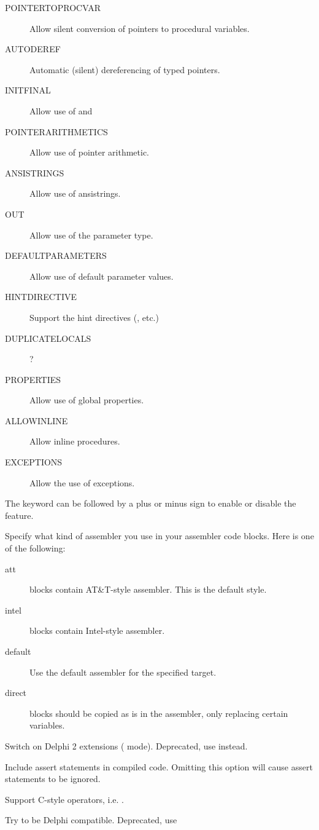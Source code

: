 \begin{description}
\begin{description}
\item[POINTERTOPROCVAR] Allow silent conversion of pointers to procedural
variables.
\item[AUTODEREF] Automatic (silent) dereferencing of typed pointers.
\item[INITFINAL] Allow use of  and 
\item[POINTERARITHMETICS] Allow use of pointer arithmetic.
\item[ANSISTRINGS] Allow use of ansistrings.
\item[OUT] Allow use of the  parameter type.
\item[DEFAULTPARAMETERS] Allow use of default parameter values.
\item[HINTDIRECTIVE] Support the hint directives (,  etc.)
\item[DUPLICATELOCALS] ?
\item[PROPERTIES] Allow use of global properties.
\item[ALLOWINLINE] Allow inline procedures.
\item[EXCEPTIONS] Allow the use of exceptions.
\end{description}
The keyword can be followed by a plus or minus sign to enable or disable the
feature.
\item [-Rxxx]  Specify what kind of assembler you use in
your  assembler code blocks. Here  is one of the following:
\begin{description}
\item [att\ ]  blocks contain AT\&T-style  assembler.
This is the default style.
\item [intel]  blocks contain Intel-style assembler.
\item [default] Use the default assembler for the specified target.
\item [direct]  blocks should be copied as is in the assembler,
only replacing certain variables. 
\end{description}
\item [-S2]  Switch on Delphi 2 extensions ( mode). 
Deprecated, use  instead.
\item [-Sa]  Include assert statements in compiled code. Omitting 
this option will cause assert statements to be ignored.
\item [-Sc]  Support C-style operators, i.e. .
\item [-Sd]  Try to be Delphi compatible. Deprecated, use

\end{description}
